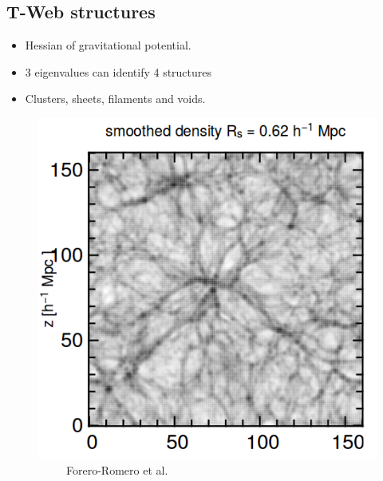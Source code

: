 \documentclass[xcolor=dvipsnames]{beamer}
\begin{document}
\subsection{T-Web structures}
\begin{frame}
\begin{itemize}
\item Hessian of gravitational potential.
\item 3 eigenvalues can identify 4 structures
\item Clusters, sheets, filaments and voids.
\end{itemize}
\begin{figure}[ht]
        \begin{minipage}[b]{0.45\linewidth}
            \centering
            \includegraphics[width=\textwidth]{tweb}
            {\tiny \ \ \ \ \   Forero-Romero et al. \cite{forero}}


\end{minipage}
\end{figure}
\end{frame}
\end{document}
